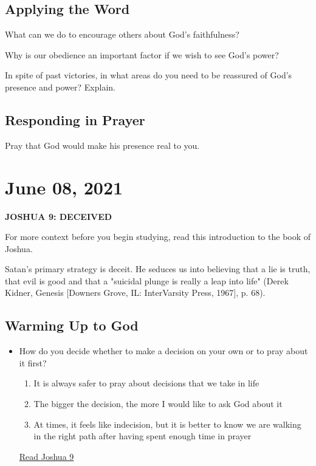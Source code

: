 \documentclass[11pt]{article}
\begin{document}
\subsection{Applying the Word}
\label{sec:org110e566}

What can we do to encourage others about God's faithfulness?

Why is our obedience an important factor if we wish to see God's
power?

In spite of past victories, in what areas do you need to be reassured
of God's presence and power? Explain.

\subsection{Responding in Prayer}
\label{sec:orgf29d1f5}

Pray that God would make his presence real to you.

\section{June 08, 2021}
\label{sec:org9d50b56}
\textbf{\textbf{JOSHUA 9: DECEIVED}}

For more context before you begin studying, read this introduction to
the book of Joshua.

Satan's primary strategy is deceit. He seduces us into believing that
a lie is truth, that evil is good and that a "suicidal plunge is
really a leap into life" (Derek Kidner, Genesis [Downers Grove, IL:
InterVarsity Press, 1967], p. 68).

\subsection{Warming Up to God}
\label{sec:org1c36b47}

\begin{itemize}
\item How do you decide whether to make a decision on your own or to pray
about it first?
\begin{enumerate}
\item It is always safer to pray about decisions that we take in life
\item The bigger the decision, the more I would like to ask God about it
\item At times, it feels like indecision, but it is better to know we
are walking in the right path after having spent enough time in
prayer
\end{enumerate}

\href{https://www.biblegateway.com/passage/?search=Joshua\%209\&version=NIV\&interface=print}{Read Joshua 9}
\end{itemize}
\end{document}
